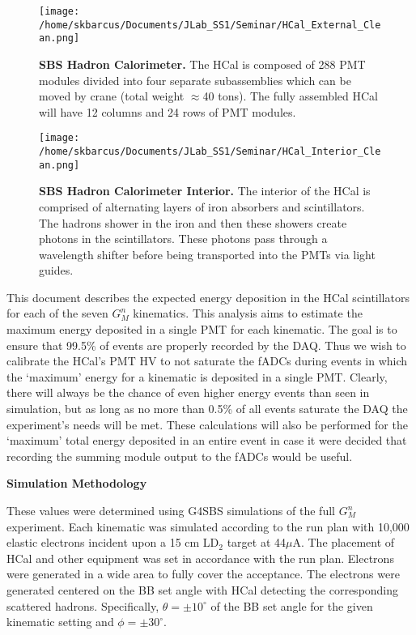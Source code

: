 \documentclass[10pt]{article}
\begin{document}
	\begin{figure}[!ht]
	\begin{center}
	\texttt{[image: /home/skbarcus/Documents/JLab\_SS1/Seminar/HCal\_External\_Clean.png]}
	\end{center}
	\caption{
	{\bf{SBS Hadron Calorimeter.}} The HCal is composed of 288 PMT modules divided into four separate subassemblies which can be moved by crane (total weight $\approx$40 tons). The fully assembled HCal will have 12 columns and 24 rows of PMT modules. }
	\label{fig:HCal}
	\end{figure}	
	
	\begin{figure}[!ht]
	\begin{center}
	\texttt{[image: /home/skbarcus/Documents/JLab\_SS1/Seminar/HCal\_Interior\_Clean.png]}
	\end{center}
	\caption{
	{\bf{SBS Hadron Calorimeter Interior.}} The interior of the HCal is comprised of alternating layers of iron absorbers and scintillators. The hadrons shower in the iron and then these showers create photons in the scintillators. These photons pass through a wavelength shifter before being transported into the PMTs via light guides.}
	\label{fig:HCal_interior}
	\end{figure}	

This document describes the expected energy deposition in the HCal scintillators for each of the seven $G_M^n$ kinematics. This analysis aims to estimate the maximum energy deposited in a single PMT for each kinematic. The goal is to ensure that 99.5\% of events are properly recorded by the DAQ. Thus we wish to calibrate the HCal's PMT HV to not saturate the fADCs during events in which the `maximum' energy for a kinematic is deposited in a single PMT. Clearly, there will always be the chance of even higher energy events than seen in simulation, but as long as no more than 0.5\% of all events saturate the DAQ the experiment's needs will be met. These calculations will also be performed for the `maximum' total energy deposited in an entire event in case it were decided that recording the summing module output to the fADCs would be useful.
\vspace{3mm}

{\large \noindent \bf{Simulation Methodology}}
\vspace{3mm}

These values were determined using G4SBS simulations of the full $G_M^n$ experiment. Each kinematic was simulated according to the run plan with 10,000 elastic electrons incident upon a 15 cm LD$_2$ target at 44$\mu$A. The placement of HCal and other equipment was set in accordance with the run plan. Electrons were generated in a wide area to fully cover the acceptance. The electrons were generated centered on the BB set angle with HCal detecting the corresponding scattered hadrons. Specifically, $\theta = \pm10^{\circ}$ of the BB set angle for the given kinematic setting and $\phi = \pm30^{\circ}$.
\vspace{3mm}
\end{document}
